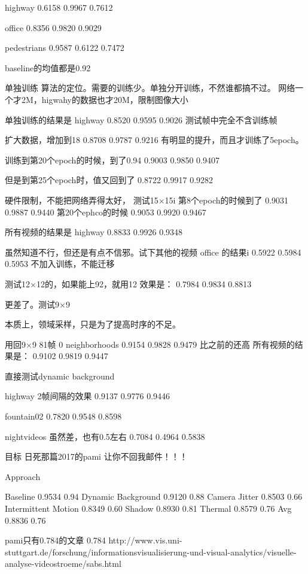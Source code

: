 highway
    0.6158    0.9967    0.7612

office
    0.8356    0.9820    0.9029

pedestrians
    0.9587    0.6122    0.7472

baseline的均值都是0.92

单独训练
算法的定位。需要的训练少。单独分开训练，不然谁都搞不过。
网络一个才2M，higwahy的数据也才20M，限制图像大小

单独训练的结果是
highway
    0.8520    0.9595    0.9026
测试帧中完全不含训练帧

扩大数据，增加到18
    0.8708    0.9787    0.9216
    有明显的提升，而且才训练了5epoch。

训练到第20个epoch的时候，到了0.94
    0.9003    0.9850    0.9407

但是到第25个epoch时，值又回到了
    0.8722    0.9917    0.9282

硬件限制，不能把网络弄得太好，
测试15×15i
第8个epoch的时候到了
    0.9031    0.9887    0.9440
第20个ephco的时候
    0.9053    0.9920    0.9467

所有视频的结果是  highway
    0.8833    0.9926    0.9348

虽然知道不行，但还是有点不信邪。试下其他的视频
office 的结果i
    0.5922    0.5984    0.5953
    不加入训练，不能迁移

测试12×12的，如果能上92，就用12
效果是：
    0.7984    0.9834    0.8813

    更差了。测试9×9

本质上，领域采样，只是为了提高时序的不足。

用回9×9 81帧 0 neighborhoods
    0.9154    0.9828    0.9479
比之前的还高 
所有视频的结果是：
    0.9102    0.9819    0.9447

直接测试dynamic background

highway 2帧间隔的效果
    0.9137    0.9776    0.9446

fountain02
    0.7820    0.9548    0.8598


nightvideos 虽然差，也有0.5左右
    0.7084    0.4964    0.5838

目标 日死那篇2017的pami 让你不回我邮件！！！

Approach	


Baseline	            0.9534	    0.94
Dynamic Background	    0.9120	    0.88
Camera Jitter	        0.8503	    0.66
Intermittent Motion	    0.8349	    0.60
Shadow	                0.8930	    0.81
Thermal	                0.8579	    0.76
Avg                     0.8836      0.76

pami只有0.784的文章
0.784
http://www.vis.uni-stuttgart.de/forschung/informationsvisualisierung-und-visual-analytics/visuelle-analyse-videostroeme/sabs.html

